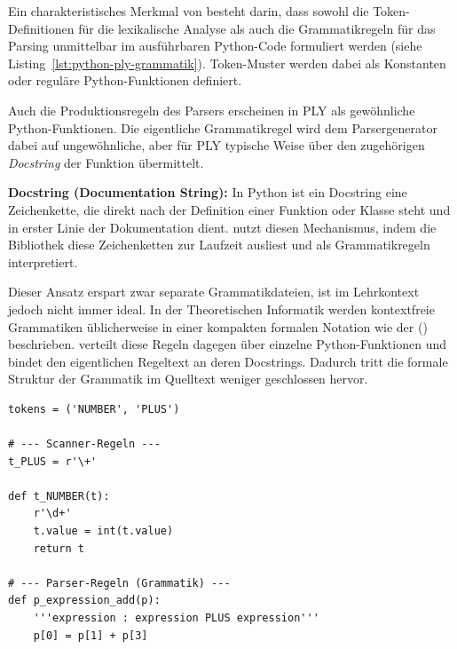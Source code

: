 Ein charakteristisches Merkmal von \emph{} besteht darin, dass sowohl die Token-Definitionen für die lexikalische Analyse als auch die Grammatikregeln für das Parsing unmittelbar im ausführbaren Python-Code formuliert werden (siehe Listing~\ref{lst:python-ply-grammatik}). Token-Muster werden dabei als Konstanten oder reguläre Python-Funktionen definiert.

Auch die Produktionsregeln des Parsers erscheinen in PLY als gewöhnliche Python-Funktionen. Die eigentliche Grammatikregel wird dem Parsergenerator dabei auf ungewöhnliche, aber für PLY typische Weise über den zugehörigen \textit{Docstring} der Funktion übermittelt.

\begin{definition}
\label{def:docstring}
\textbf{Docstring (Documentation String):}
In Python ist ein Docstring eine Zeichenkette, die direkt nach der Definition einer Funktion oder Klasse steht und in erster Linie der Dokumentation dient. \emph{} nutzt diesen Mechanismus, indem die Bibliothek diese Zeichenketten zur Laufzeit ausliest und als Grammatikregeln interpretiert.
\end{definition}

Dieser Ansatz erspart zwar separate Grammatikdateien, ist im Lehrkontext jedoch nicht immer ideal. In der Theoretischen Informatik werden kontextfreie Grammatiken üblicherweise in einer kompakten formalen Notation wie der \textit{} () beschrieben. \emph{} verteilt diese Regeln dagegen über einzelne Python-Funktionen und bindet den eigentlichen Regeltext an deren Docstrings. Dadurch tritt die formale Struktur der Grammatik im Quelltext weniger geschlossen hervor.

\begin{listing}[htbp]
    \caption{Scanner- und Parser-Regeln in PLY (Python)}
    \label{lst:python-ply-grammatik}
\begin{verbatim}
tokens = ('NUMBER', 'PLUS')

# --- Scanner-Regeln ---
t_PLUS = r'\+'

def t_NUMBER(t):
    r'\d+'
    t.value = int(t.value)
    return t

# --- Parser-Regeln (Grammatik) ---
def p_expression_add(p):
    '''expression : expression PLUS expression'''
    p[0] = p[1] + p[3]
\end{verbatim}
\end{listing}

